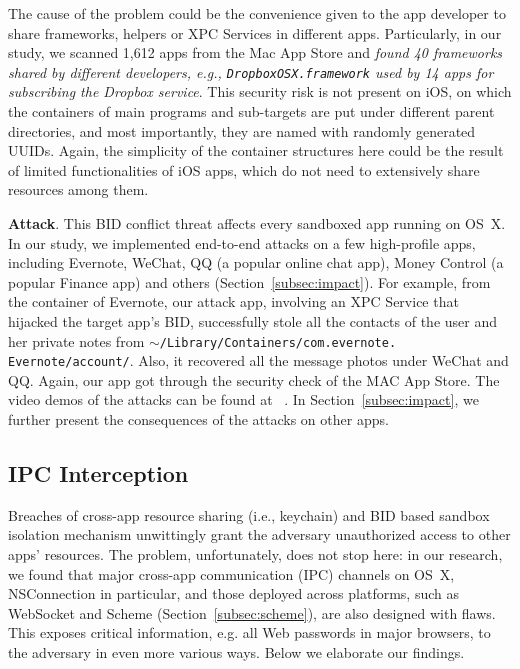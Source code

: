 \documentclass{article}
\newcommand{\ignore}[1]{}
\begin{document}
The cause of the problem could be the convenience given to the app developer to share frameworks, helpers or XPC Services in different apps. Particularly, in our study, we scanned 1,612 apps from the Mac App Store and \textit{found 40 frameworks shared by different developers, e.g., \texttt{DropboxOSX.framework} used by 14 apps for subscribing the Dropbox service}. This security risk is not present on iOS, on which the containers of main programs and sub-targets are put under different parent directories, and most importantly, they are named with randomly generated UUIDs. Again, the simplicity of the container structures here could be the result of limited functionalities of iOS apps, which do not need to extensively share resources among them.



\vspace {3pt}\noindent\textbf{Attack}. This BID conflict threat affects every sandboxed app running on OS~X. In our study,  we implemented end-to-end attacks on a few high-profile apps, including Evernote, WeChat, QQ (a popular online chat app), Money Control (a popular Finance app) and others (Section~\ref{subsec:impact}). For example, from the container of Evernote, our attack app, involving an XPC Service that hijacked the target app's BID, successfully stole all the contacts of the user and her private notes from \texttt{$\sim$/Library/Containers/com.evernote.\\Evernote/account/}.  Also, it recovered all the message photos under WeChat and QQ. Again, our app got through the security check of the MAC App Store. The video demos of the attacks can be found at ~\cite{supporting}. In Section~\ref{subsec:impact}, we further present the consequences of the attacks on other apps.








\subsection{IPC Interception}
\label{subsec:IPC}




Breaches of cross-app resource sharing (i.e., keychain) and BID based sandbox isolation mechanism unwittingly grant the adversary unauthorized access to other apps' resources. The problem, unfortunately, does not stop here: in our research, we found that major cross-app communication (IPC) channels on OS~X, NSConnection in particular, and those deployed across platforms, such as WebSocket and Scheme (Section~\ref{subsec:scheme}), are also designed with flaws. This exposes critical information, e.g. all Web passwords in major browsers, to the adversary in even more various ways.  Below we elaborate our findings\ignore{ about NSConnection, XPC and WebSocket, and leave URL scheme, a more popular channel for both OS~X and iOS}.
\end{document}
